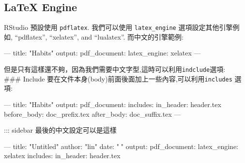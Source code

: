 \documentclass[]{book}
\newenvironment{Shaded}{\begin{snugshade}}{\end{snugshade}}
\newcommand{\StringTok}[1]{\textcolor[rgb]{0.31,0.60,0.02}{#1}}
\newcommand{\OtherTok}[1]{\textcolor[rgb]{0.56,0.35,0.01}{#1}}
\newcommand{\FunctionTok}[1]{\textcolor[rgb]{0.00,0.00,0.00}{#1}}
\newcommand{\AttributeTok}[1]{\textcolor[rgb]{0.77,0.63,0.00}{#1}}
\theoremstyle{definition}
\theoremstyle{definition}
\theoremstyle{definition}
\theoremstyle{remark}
\begin{document}
\begin{enumerate}
  \subsection{LaTeX Engine}\label{latex-engine}

  RStudio 預設使用 \texttt{pdflatex}. 我們可以使用
  \texttt{latex\_engine} 選項設定其他引擎例如, ``pdflatex'',
  ``xelatex'', and ``lualatex''. 而中文的引擎範例:

\begin{Shaded}
\begin{Highlighting}[]
\OtherTok{---}
\FunctionTok{title:}\AttributeTok{ }\StringTok{"Habits"}
\FunctionTok{output:}
  \FunctionTok{pdf_document:}
\FunctionTok{latex_engine:}\AttributeTok{ xelatex}
\OtherTok{---}
\end{Highlighting}
\end{Shaded}

  但是只有這樣還不夠，因為我們需要中文字型,這時可以利用\texttt{indclude}選項:\\
  \#\#\# Include
  要在文件本身(body)前面後面加上一些內容,可以利用\texttt{includes} 選項:
\end{enumerate}

\begin{Shaded}
\begin{Highlighting}[]
\OtherTok{---}
\FunctionTok{title:}\AttributeTok{ }\StringTok{"Habits"}
\FunctionTok{output:}
  \FunctionTok{pdf_document:}
    \FunctionTok{includes:}
      \FunctionTok{in_header:}\AttributeTok{ header.tex}
      \FunctionTok{before_body:}\AttributeTok{ doc_prefix.tex}
      \FunctionTok{after_body:}\AttributeTok{ doc_suffix.tex}
\OtherTok{---}
\end{Highlighting}
\end{Shaded}

::: sidebar 最後的中文設定可以是這樣

\begin{Shaded}
\begin{Highlighting}[]

\OtherTok{---}
\FunctionTok{title:}\AttributeTok{ }\StringTok{"Untitled"}
\FunctionTok{author:}\AttributeTok{ }\StringTok{"lin"}
\FunctionTok{date:}\AttributeTok{ }\StringTok{""}
\FunctionTok{output:}
  \FunctionTok{pdf_document:}\AttributeTok{ }
    \FunctionTok{latex_engine:}\AttributeTok{ xelatex    }
    \FunctionTok{includes:}
      \FunctionTok{in_header:}\AttributeTok{ header.tex    }
\end{Highlighting}
\end{Shaded}
\end{document}
